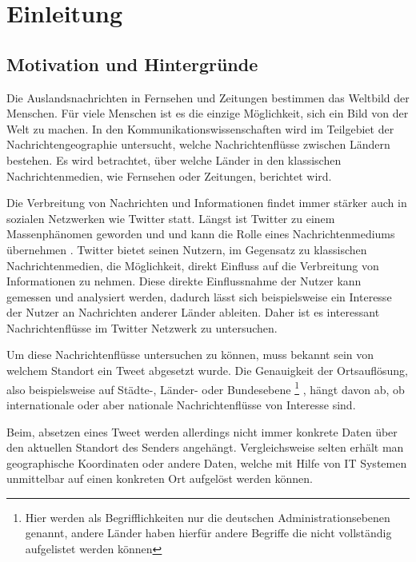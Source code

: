 \chapter{Einleitung}

	\section{Motivation und Hintergründe}
		Die Auslandsnachrichten in Fernsehen und Zeitungen bestimmen das Weltbild der Menschen.
		Für viele Menschen ist es die einzige Möglichkeit, sich ein Bild von der Welt zu machen. 
		In den Kommunikationswissenschaften wird im Teilgebiet der Nachrichtengeographie untersucht, welche Nachrichtenflüsse zwischen Ländern bestehen.
		Es wird betrachtet, über welche Länder in den klassischen Nachrichtenmedien, wie Fernsehen oder Zeitungen, berichtet wird.

		Die Verbreitung von Nachrichten und Informationen findet immer stärker auch in sozialen Netzwerken wie Twitter statt. 
		Längst ist Twitter zu einem Massenphänomen geworden und und kann die Rolle eines Nachrichtenmediums übernehmen \cite{Petrovic2013}.
		Twitter bietet seinen Nutzern, im Gegensatz zu klassischen Nachrichtenmedien, die Möglichkeit, direkt Einfluss auf die Verbreitung von Informationen zu nehmen. 
		Diese direkte Einflussnahme der Nutzer kann gemessen und analysiert werden, dadurch lässt sich beispielsweise ein Interesse der Nutzer an Nachrichten anderer Länder ableiten.
		Daher ist es interessant Nachrichtenflüsse im Twitter Netzwerk zu untersuchen. 

		Um diese Nachrichtenflüsse untersuchen zu können, muss bekannt sein von welchem Standort ein Tweet abgesetzt wurde. 
		Die Genauigkeit der Ortsauflösung, also beispielsweise auf Städte-, Länder- oder Bundesebene \footnote{Hier werden als Begrifflichkeiten nur die deutschen Administrationsebenen genannt, andere Länder haben hierfür andere Begriffe die nicht vollständig aufgelistet werden können} , hängt davon ab, ob internationale oder aber nationale Nachrichtenflüsse von Interesse sind.
		
		Beim, absetzen eines Tweet werden allerdings nicht immer konkrete Daten über den aktuellen Standort des Senders angehängt.
		Vergleichsweise selten erhält man geographische Koordinaten oder andere Daten, welche mit Hilfe von IT Systemen unmittelbar auf einen konkreten Ort aufgelöst werden können.


	  



